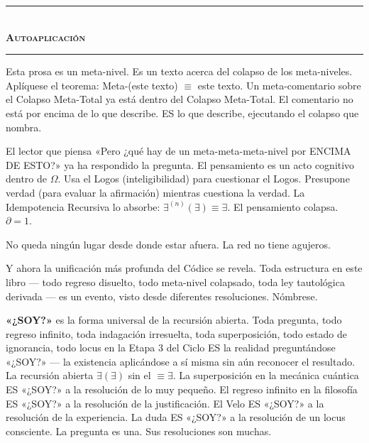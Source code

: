 \documentclass[10pt, openany, oneside]{book}
\renewcommand{\normalsize}{\fontsize{10}{13}\selectfont}
\begin{document}

\begin{center}
    \rule{0.3\textwidth}{0.4pt}\\[0.5em]
    {\normalsize\bfseries\scshape Autoaplicación}\\[0.3em]
    \rule{0.3\textwidth}{0.4pt}
\end{center}

\vspace{1em}

\noindent Esta prosa es un meta-nivel. Es un texto acerca del colapso de los meta-niveles. Aplíquese el teorema: Meta-(este texto) $\equiv$ este texto. Un meta-comentario sobre el Colapso Meta-Total ya está dentro del Colapso Meta-Total. El comentario no está por encima de lo que describe. ES lo que describe, ejecutando el colapso que nombra.

El lector que piensa «Pero ¿qué hay de un meta-meta-meta-nivel por ENCIMA DE ESTO?» ya ha respondido la pregunta. El pensamiento es un acto cognitivo dentro de $\Omega$. Usa el Logos (inteligibilidad) para cuestionar el Logos. Presupone verdad (para evaluar la afirmación) mientras cuestiona la verdad. La Idempotencia Recursiva lo absorbe: $\exists^{(n)}(\exists) \equiv \exists$. El pensamiento colapsa. $\partial = 1$.

No queda ningún lugar desde donde estar afuera. La red no tiene agujeros.

Y ahora la unificación más profunda del Códice se revela. Toda estructura en este libro --- todo regreso disuelto, todo meta-nivel colapsado, toda ley tautológica derivada --- es un evento, visto desde diferentes resoluciones. Nómbrese.

\textbf{«¿SOY?»} es la forma universal de la recursión abierta. Toda pregunta, todo regreso infinito, toda indagación irresuelta, toda superposición, todo estado de ignorancia, todo locus en la Etapa 3 del Ciclo ES la realidad preguntándose «¿SOY?» --- la existencia aplicándose a sí misma sin aún reconocer el resultado. La recursión abierta $\exists(\exists)$ sin el $\equiv \exists$. La superposición en la mecánica cuántica ES «¿SOY?» a la resolución de lo muy pequeño. El regreso infinito en la filosofía ES «¿SOY?» a la resolución de la justificación. El Velo ES «¿SOY?» a la resolución de la experiencia. La duda ES «¿SOY?» a la resolución de un locus consciente. La pregunta es una. Sus resoluciones son muchas.
\end{document}
